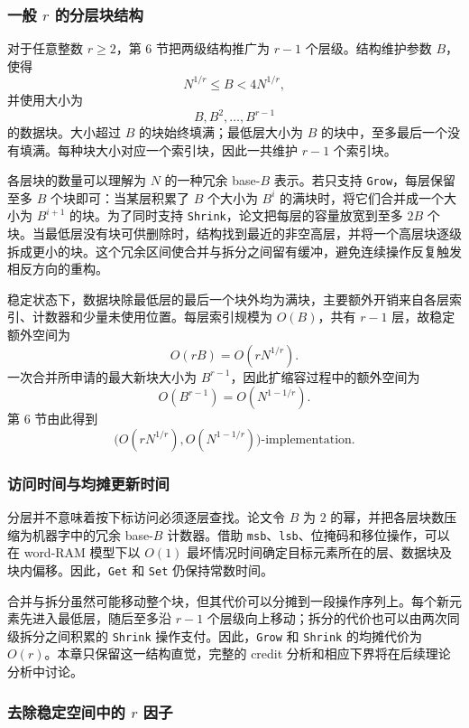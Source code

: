 \documentclass[12pt,a4paper]{article}
\begin{document}
\subsubsection{一般 $r$ 的分层块结构}

对于任意整数 $r\geq 2$，第 6 节把两级结构推广为 $r-1$ 个层级\cite{tarjan2023optimalresizablearrays}。结构维护参数 $B$，使得
\[
    N^{1/r}\leq B<4N^{1/r},
\]
并使用大小为
\[
    B,B^2,\ldots,B^{r-1}
\]
的数据块。大小超过 $B$ 的块始终填满；最低层大小为 $B$ 的块中，至多最后一个没有填满。每种块大小对应一个索引块，因此一共维护 $r-1$ 个索引块。

各层块的数量可以理解为 $N$ 的一种冗余 base-$B$ 表示。若只支持 \texttt{Grow}，每层保留至多 $B$ 个块即可：当某层积累了 $B$ 个大小为 $B^i$ 的满块时，将它们合并成一个大小为 $B^{i+1}$ 的块。为了同时支持 \texttt{Shrink}，论文把每层的容量放宽到至多 $2B$ 个块。当最低层没有块可供删除时，结构找到最近的非空高层，并将一个高层块逐级拆成更小的块。这个冗余区间使合并与拆分之间留有缓冲，避免连续操作反复触发相反方向的重构。

稳定状态下，数据块除最低层的最后一个块外均为满块，主要额外开销来自各层索引、计数器和少量未使用位置。每层索引规模为 $O(B)$，共有 $r-1$ 层，故稳定额外空间为
\[
    O(rB)=O(rN^{1/r}).
\]
一次合并所申请的最大新块大小为 $B^{r-1}$，因此扩缩容过程中的额外空间为
\[
    O(B^{r-1})=O(N^{1-1/r}).
\]
第 6 节由此得到
\[
    \bigl(O(rN^{1/r}),O(N^{1-1/r})\bigr)\text{-implementation}.
\]

\subsubsection{访问时间与均摊更新时间}

分层并不意味着按下标访问必须逐层查找。论文令 $B$ 为 $2$ 的幂，并把各层块数压缩为机器字中的冗余 base-$B$ 计数器。借助 \texttt{msb}、\texttt{lsb}、位掩码和移位操作，可以在 word-RAM 模型下以 $O(1)$ 最坏情况时间确定目标元素所在的层、数据块及块内偏移。因此，\texttt{Get} 和 \texttt{Set} 仍保持常数时间\cite{tarjan2023optimalresizablearrays}。

合并与拆分虽然可能移动整个块，但其代价可以分摊到一段操作序列上。每个新元素先进入最低层，随后至多沿 $r-1$ 个层级向上移动；拆分的代价也可以由两次同级拆分之间积累的 \texttt{Shrink} 操作支付。因此，\texttt{Grow} 和 \texttt{Shrink} 的均摊代价为 $O(r)$。本章只保留这一结构直觉，完整的 credit 分析和相应下界将在后续理论分析中讨论。

\subsubsection{去除稳定空间中的 $r$ 因子}
\end{document}
